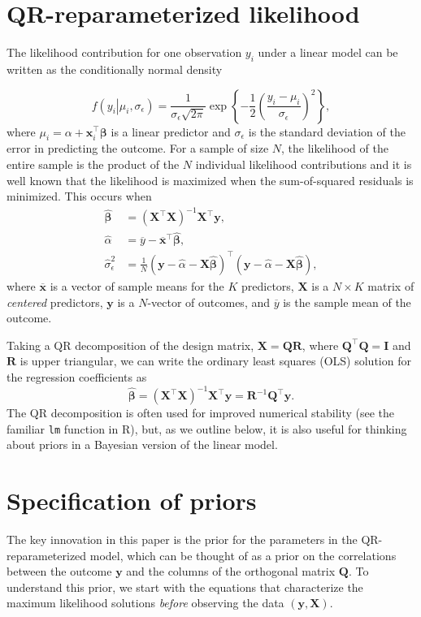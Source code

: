 \documentclass[11pt]{article}
\newcommand{\boldbeta}{\boldsymbol{\beta}}
\newcommand{\hatbeta}{\widehat{\boldbeta}}
\newcommand{\hatalpha}{\widehat{\alpha}}
\newcommand{\sigmaEps}{\sigma_{\epsilon}}
\newcommand{\X}{\mathbf{X}}
\newcommand{\y}{\mathbf{y}}
\newcommand{\Q}{\mathbf{Q}}
\newcommand{\R}{\mathbf{R}}
\newcommand{\given}{\left.\right|}
\begin{document}
\section{QR-reparameterized likelihood}
\label{sec:likelihood}

The likelihood contribution for one observation $y_i$ under a linear model
can be written as the conditionally normal density

$$
f \left(y_i \given \mu_i, \sigmaEps \right) = \frac{1}{\sigmaEps \sqrt{2 \pi}}
\exp{\left\{-\frac{1}{2} \left(\frac{y_i - \mu_i}{\sigmaEps}\right)^2\right\}},
$$
%
where $\mu_i = \alpha + \mathbf{x}_i^\top \boldbeta$ is a linear
predictor and $\sigmaEps$ is the standard deviation of the error in predicting
the outcome. For a sample of size $N$, the likelihood of the entire sample is
the product of the $N$ individual likelihood contributions and it is well known
that the likelihood is maximized when the sum-of-squared residuals is minimized.
This occurs when
%
\begin{align*}
\hatbeta &= \left(\X^\top \X \right)^{-1} \X^\top \y,\\
\hatalpha &= \overline{y} - \overline{\mathbf{x}}^\top \hatbeta,\\
\widehat{\sigma}_{\epsilon}^2 &=
  \frac{1}{N}
  \left(\y - \hatalpha - \X \hatbeta \right)^\top
  \left(\y - \hatalpha - \X \hatbeta \right),
\end{align*}
%
where $\overline{\mathbf{x}}$ is a vector of sample means for the
$K$ predictors, $\X$ is a $N \times K$ matrix of \emph{centered} predictors,
$\y$ is a $N$-vector of outcomes, and $\overline{y}$ is the sample mean of the
outcome.

Taking a QR decomposition of the design matrix, $\X = \Q\R$, where
$\Q^\top \Q = \mathbf{I}$ and $\R$ is upper triangular, we can write the
ordinary least squares (OLS) solution for the regression coefficients as
$$\hatbeta = \left(\X^\top \X \right)^{-1} \X^\top \y = \R^{-1} \Q^\top \y.$$
%
The QR decomposition is often used for improved numerical stability (see the
familiar {\tt lm} function in R), but, as we outline below, it is also useful
for thinking about priors in a Bayesian version of the linear model.


\section{Specification of priors}
\label{sec:priors}

The key innovation in this paper is the prior for the parameters in the
QR-reparameterized model, which can be thought of as a prior on the correlations
between the outcome $\y$ and the columns of the orthogonal matrix $\Q$. To
understand this prior, we start with the equations that characterize the maximum
likelihood solutions \emph{before} observing the data $\left(\y, \X\right)$.
\end{document}
